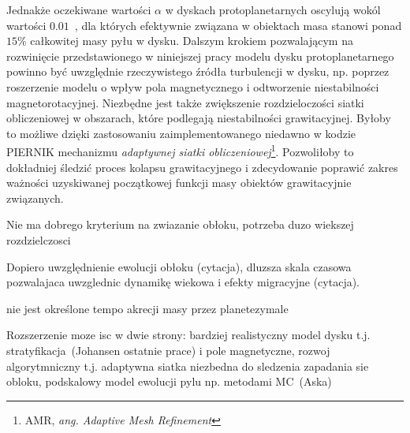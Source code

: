Jednakże oczekiwane wartości $\alpha$ w dyskach protoplanetarnych oscylują wokól
wartości $0.01$~\cite{FD11}, dla których efektywnie związana w obiektach masa
stanowi ponad $15\%$ całkowitej masy pyłu w dysku. Dalszym krokiem pozwalającym
na rozwinięcie przedstawionego w niniejszej pracy modelu dysku protoplanetarnego
powinno być uwzględnie rzeczywistego źródła turbulencji w dysku, np. poprzez
roszerzenie modelu o wpływ pola magnetycznego i odtworzenie niestabilności
magnetorotacyjnej. Niezbędne jest także zwiększenie rozdzieloczości siatki
obliczeniowej w obszarach, które podlegają niestabilności grawitacyjnej. Byłoby
to możliwe dzięki zastosowaniu zaimplementowanego niedawno w kodzie \textsc{PIERNIK}
mechanizmu \emph{adaptywnej siatki obliczeniowej}\footnote{AMR, \emph{ang.
Adaptive Mesh Refinement}}. Pozwoliłoby to dokładniej śledzić proces kolapsu
grawitacyjnego i zdecydowanie poprawić zakres ważności uzyskiwanej początkowej
funkcji masy obiektów grawitacyjnie związanych.

Nie ma dobrego kryterium na zwiazanie obłoku, potrzeba duzo wiekszej rozdzielczosci

Dopiero uwzględnienie ewolucji obłoku (cytacja), dluzsza skala czasowa
pozwalajaca uwzglednic dynamikę wiekowa i efekty migracyjne (cytacja).

\par nie jest określone tempo akrecji masy przez planetezymale

Rozszerzenie moze isc w dwie strony: bardziej realistyczny model dysku t.j.
stratyfikacja~(Johansen ostatnie prace) i pole magnetyczne, rozwoj
algorytmniczny t.j. adaptywna siatka niezbedna do sledzenia zapadania sie
obloku, podskalowy model ewolucji pylu np.  metodami MC~(Aska)



